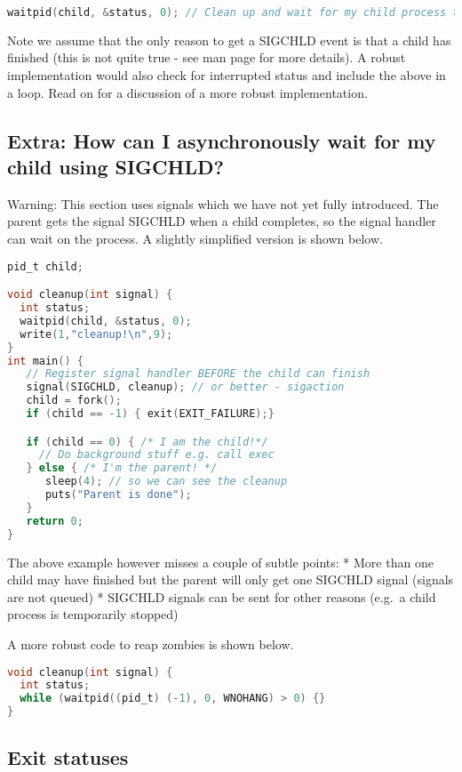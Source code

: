 \begin{lstlisting}[language=C]
waitpid(child, &status, 0); // Clean up and wait for my child process to finish.
\end{lstlisting}

Note we assume that the only reason to get a SIGCHLD event is that a child has finished (this is not quite true - see man page for more details). A robust implementation would also check for interrupted status and include the above in a loop. Read on for a discussion of a more robust implementation.

\subsection{Extra: How can I asynchronously wait for my child using SIGCHLD?}

Warning: This section uses signals which we have not yet fully introduced. The parent gets the signal SIGCHLD when a child completes, so the signal handler can wait on the process. A slightly simplified version is shown below.

\begin{lstlisting}[language=C]
pid_t child;

void cleanup(int signal) {
  int status;
  waitpid(child, &status, 0);
  write(1,"cleanup!\n",9);
}
int main() {
   // Register signal handler BEFORE the child can finish
   signal(SIGCHLD, cleanup); // or better - sigaction
   child = fork();
   if (child == -1) { exit(EXIT_FAILURE);}

   if (child == 0) { /* I am the child!*/
     // Do background stuff e.g. call exec   
   } else { /* I'm the parent! */
      sleep(4); // so we can see the cleanup
      puts("Parent is done");
   }
   return 0;
} 
\end{lstlisting}

The above example however misses a couple of subtle points: * More than one child may have finished but the parent will only get one SIGCHLD signal (signals are not queued) * SIGCHLD signals can be sent for other reasons (e.g.~a child process is temporarily stopped)

A more robust code to reap zombies is shown below.

\begin{lstlisting}[language=C]
void cleanup(int signal) {
  int status;
  while (waitpid((pid_t) (-1), 0, WNOHANG) > 0) {}
}
\end{lstlisting}

\subsection{Exit statuses}


